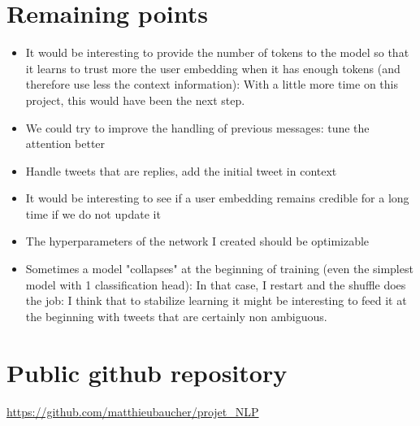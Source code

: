 \documentclass[12pt]{article}
\begin{document}
\section{Remaining points}

\begin{itemize}
\item  It would be interesting to provide the number of tokens to the model so that it learns to trust more the user embedding when it has enough tokens (and therefore use less the context information): With a little more time on this project, this would have been the next step.
\item  We could try to improve the handling of previous messages: tune the attention better
\item  Handle tweets that are replies, add the initial tweet in context
\item  It would be interesting to see if a user embedding remains credible for a long time if we do not update it 
\item  The hyperparameters of the network I created should be optimizable 
\item  Sometimes a model "collapses" at the beginning of training (even the simplest model with 1 classification head):
In that case, I restart and the shuffle does the job: I think that to stabilize learning it might be interesting to feed it at the beginning with tweets that are certainly non ambiguous.
\end{itemize}

\section{Public github repository}

\url{https://github.com/matthieubaucher/projet_NLP}
\end{document}
